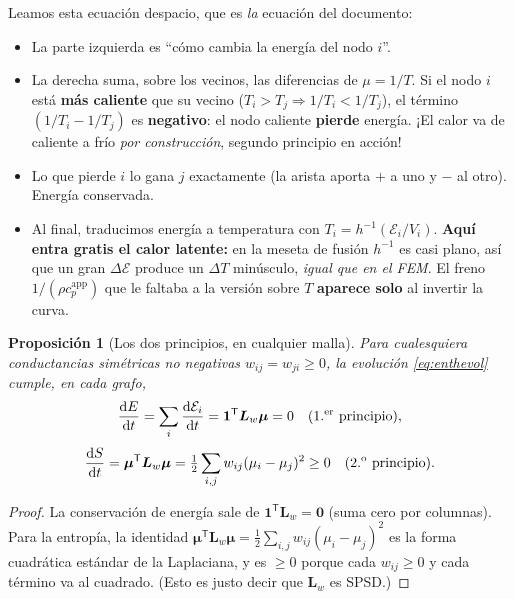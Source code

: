 \documentclass[11pt]{article}
\newcommand{\dd}{\mathrm{d}}
\newcommand{\cpapp}{c_p^{\mathrm{app}}}
\newcommand{\Lw}{\bm{L}_{w}}
\newcommand{\bmu}{\bm{\mu}}
\theoremstyle{definition}
\theoremstyle{plain}
\newtheorem{proposicion}{Proposición}[section]
\begin{document}
Leamos esta ecuación despacio, que es \emph{la} ecuación del documento:
\begin{itemize}[leftmargin=1.5em]
  \item La parte izquierda es ``cómo cambia la energía del nodo $i$''.
  \item La derecha suma, sobre los vecinos, las diferencias de $\mu=1/T$. Si el
  nodo $i$ está \textbf{más caliente} que su vecino ($T_i>T_j\Rightarrow 1/T_i <
  1/T_j$), el término $(1/T_i-1/T_j)$ es \textbf{negativo}: el nodo caliente
  \textbf{pierde} energía. ¡El calor va de caliente a frío \emph{por
  construcción}, segundo principio en acción!
  \item Lo que pierde $i$ lo gana $j$ exactamente (la arista aporta $+$ a uno y $-$
  al otro). Energía conservada.
  \item Al final, traducimos energía a temperatura con $T_i=h^{-1}(\mathcal
  E_i/V_i)$. \textbf{Aquí entra gratis el calor latente:} en la meseta de fusión
  $h^{-1}$ es casi plano, así que un gran $\Delta\mathcal E$ produce un
  $\Delta T$ minúsculo, \emph{igual que en el FEM}. El freno $1/(\rho\cpapp)$ que le
  faltaba a la versión sobre $T$ \textbf{aparece solo} al invertir la curva.
\end{itemize}

\begin{proposicion}[Los dos principios, en cualquier malla]
\label{prop:laws}
Para cualesquiera conductancias simétricas no negativas $w_{ij}=w_{ji}\ge0$, la
evolución \eqref{eq:enthevol} cumple, en cada grafo,
\begin{equation}
  \frac{\dd E}{\dd t}=\sum_i\frac{\dd\mathcal E_i}{\dd t}
  = \bm 1^{\mathsf T}\Lw\bmu = 0
  \quad(\text{1.\textsuperscript{er} principio}),
\end{equation}
\begin{equation}
  \frac{\dd S}{\dd t}=\bmu^{\mathsf T}\Lw\bmu
  = \tfrac12\sum_{i,j} w_{ij}(\mu_i-\mu_j)^2 \ge 0
  \quad(\text{2.\textsuperscript{o} principio}).
\end{equation}
\end{proposicion}
\begin{proof}
La conservación de energía sale de $\bm 1^{\mathsf T}\Lw=\bm 0$ (suma cero por
columnas). Para la entropía, la identidad
$\bmu^{\mathsf T}\Lw\bmu=\tfrac12\sum_{i,j}w_{ij}(\mu_i-\mu_j)^2$ es la forma
cuadrática estándar de la Laplaciana, y es $\ge0$ porque cada $w_{ij}\ge0$ y cada
término va al cuadrado. (Esto es justo decir que $\Lw$ es SPSD.)
\end{proof}
\end{document}
